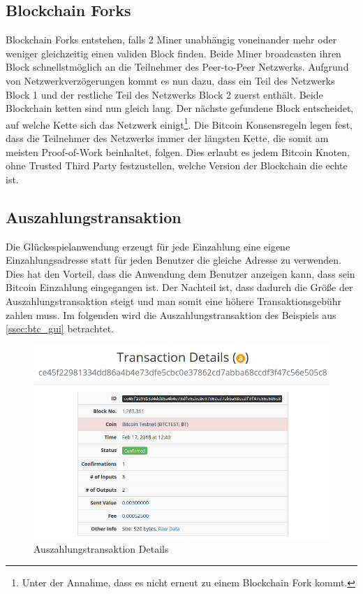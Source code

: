 \subsection{Blockchain Forks}
Blockchain Forks entstehen, falls 2 Miner unabhängig voneinander mehr oder weniger gleichzeitig einen validen Block finden. Beide Miner broadcasten ihren Block schnellstmöglich an die Teilnehmer des Peer-to-Peer Netzwerks. Aufgrund von Netzwerkverzögerungen kommt es nun dazu, dass ein Teil des Netzwerks Block 1 und der restliche Teil des Netzwerks Block 2 zuerst enthält. Beide Blockchain ketten sind nun gleich lang. Der nächste gefundene Block entscheidet, auf welche Kette sich das Netzwerk einigt\footnote{Unter der Annahme, dass es nicht erneut zu einem Blockchain Fork kommt.}. Die Bitcoin Konsensregeln legen fest, dass die Teilnehmer des Netzwerks immer der längsten Kette, die somit am meisten Proof-of-Work beinhaltet, folgen. Dies erlaubt es jedem Bitcoin Knoten, ohne Trusted Third Party festzustellen, welche Version der Blockchain die echte ist.

\subsection{Auszahlungstransaktion}
Die Glücksspielanwendung erzeugt für jede Einzahlung eine eigene Einzahlungsadresse statt für jeden Benutzer die gleiche Adresse zu verwenden. Dies hat den Vorteil, dass die Anwendung dem Benutzer anzeigen kann, dass sein Bitcoin Einzahlung eingegangen ist. Der Nachteil ist, dass dadurch die Größe der Auszahlungstransaktion steigt und man somit eine höhere Transaktionsgebühr zahlen muss. Im folgenden wird die Auszahlungstransaktion des Beispiels aus \ref{ssec:btc_gui} betrachtet.

\begin{figure}[H]
\centering
\includegraphics[width=1\linewidth]{Figures/btc_gui/btc_txn}
\decoRule
\caption{Auszahlungstransaktion Details}
\label{fig:btc_txn}
\end{figure}


